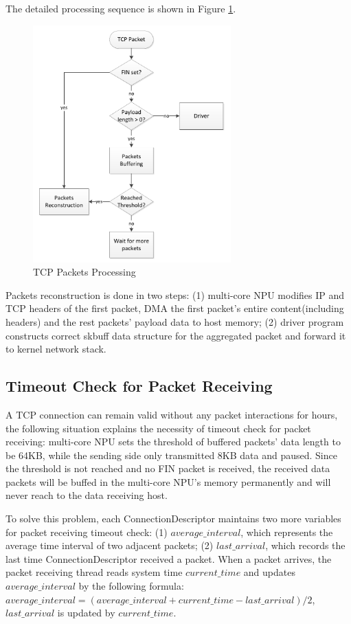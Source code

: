 \documentclass[conference]{IEEEtran}
\begin{document}
The detailed processing sequence is shown in Figure \ref{tcp packets processing}.
\begin{figure}[!t]
\centering
\includegraphics[width=3.0in]{tcp_packets_processing}
\caption{TCP Packets Processing}
\label{tcp packets processing}
\end{figure}
Packets reconstruction is done in two steps: (1) multi-core NPU modifies IP and TCP headers of the first packet, DMA the first packet's entire content(including headers) and the rest packets' payload data to host memory; (2) driver program constructs correct skbuff data structure for the aggregated packet and forward it to kernel network stack.
\subsection{Timeout Check for Packet Receiving}
A TCP connection can remain valid without any packet interactions for hours, the following situation explains the necessity of timeout check for packet receiving: multi-core NPU sets the threshold of buffered packets' data length to be 64KB, while the sending side only transmitted 8KB data and paused. Since the threshold is not reached and no FIN packet is received, the received data packets will be buffed in the multi-core NPU's memory permanently and will never reach to the data receiving host.

To solve this problem, each ConnectionDescriptor maintains two more variables for packet receiving timeout check: (1) $average\_interval$, which represents the average time interval of two adjacent packets; (2) $last\_arrival$, which records the last time ConnectionDescriptor received a packet. When a packet arrives, the packet receiving thread reads system time $current\_time$ and updates $average\_interval$ by the following formula: $average\_interval = (average\_interval + current\_time - last\_arrival) / 2$, $last\_arrival$ is updated by $current\_time$.
\end{document}

